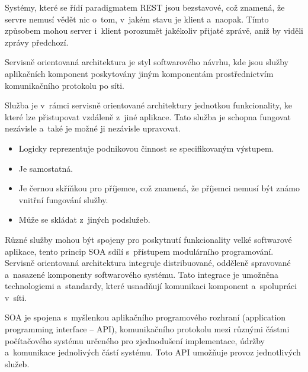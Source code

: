 \documentclass[twoside, 12pt]{article}
\begin{document}
{


Systémy, které se řídí paradigmatem REST jsou bezstavové, což znamená,
že servre nemusí vědět nic o~tom, v~jakém stavu je klient a~naopak.
Tímto způsobem mohou server i~klient porozumět  jakékoliv přijaté zprávě,
aniž by viděli zprávy předchozí.
\cite{codecademyRest}

Servisně orientovaná architektura je styl softwarového návrhu,
kde jsou služby aplikačních komponent poskytovány jiným komponentám
prostřednictvím komunikačního protokolu po síti.

Služba je v~rámci servisně orientované architektury jednotkou funkcionality,
ke které lze přistupovat vzdáleně z~jiné aplikace.
Tato služba je schopna fungovat nezávisle a~také je možné ji nezávisle upravovat.

\bigskip


\begin{itemize}

\item Logicky reprezentuje podnikovou činnost se specifikovaným výstupem.

\item Je samostatná.

\item Je černou skříňkou pro příjemce, což znamená,
že příjemci nemusí být známo vnitřní fungování služby.

\item Může se skládat z~jiných podslužeb.

\end{itemize}

Různé služby mohou být spojeny pro poskytnutí funkcionality velké softwarové aplikace,
tento princip SOA sdílí s~přístupem modulárního programování.
Servisně orientovaná architektura integruje distribuované,
odděleně spravované a~nasazené komponenty softwarového systému.
Tato integrace je umožněna technologiemi a~standardy, které usnadňují
komunikaci komponent a~spolupráci v~síti.

SOA je spojena s~myšlenkou aplikačního programového rozhraní
(application programming interface -- API), komunikačního protokolu mezi
různými částmi počítačového systému určeného pro zjednodušení implementace,
údržby a~komunikace jednolivých částí systému.
Toto API umožňuje provoz jednotlivých služeb.

}
\end{document}
